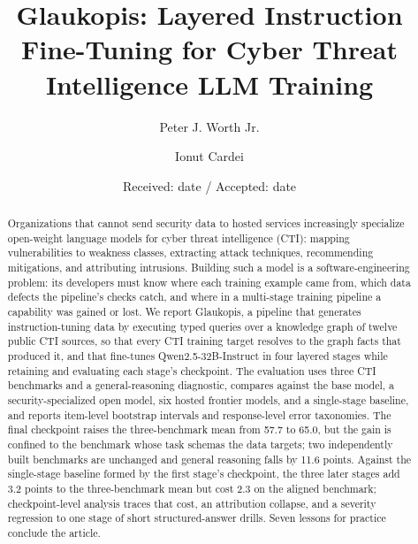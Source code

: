 \documentclass[twocolumn]{svjour3}
\begin{document}
\title{Glaukopis: Layered Instruction Fine-Tuning for Cyber Threat Intelligence LLM Training}
\author{Peter J. Worth Jr. \and Ionut Cardei}
\date{Received: date / Accepted: date}

\maketitle

\begin{abstract}
Organizations that cannot send security data to hosted services increasingly specialize open-weight language models for cyber threat intelligence (CTI): mapping vulnerabilities to weakness classes, extracting attack techniques, recommending mitigations, and attributing intrusions. Building such a model is a software-engineering problem: its developers must know where each training example came from, which data defects the pipeline's checks catch, and where in a multi-stage training pipeline a capability was gained or lost. We report Glaukopis, a pipeline that generates instruction-tuning data by executing typed queries over a knowledge graph of twelve public CTI sources, so that every CTI training target resolves to the graph facts that produced it, and that fine-tunes Qwen2.5-32B-Instruct in four layered stages while retaining and evaluating each stage's checkpoint. The evaluation uses three CTI benchmarks and a general-reasoning diagnostic, compares against the base model, a security-specialized open model, six hosted frontier models, and a single-stage baseline, and reports item-level bootstrap intervals and response-level error taxonomies. The final checkpoint raises the three-benchmark mean from 57.7 to 65.0, but the gain is confined to the benchmark whose task schemas the data targets; two independently built benchmarks are unchanged and general reasoning falls by 11.6 points. Against the single-stage baseline formed by the first stage's checkpoint, the three later stages add 3.2 points to the three-benchmark mean but cost 2.3 on the aligned benchmark; checkpoint-level analysis traces that cost, an attribution collapse, and a severity regression to one stage of short structured-answer drills. Seven lessons for practice conclude the article.
\end{abstract}
\end{document}
